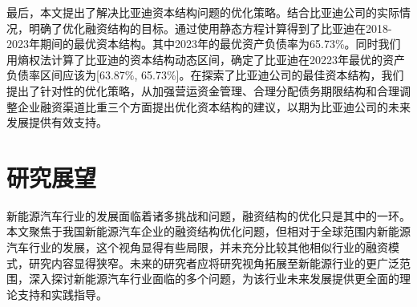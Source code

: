 最后，本文提出了解决比亚迪资本结构问题的优化策略。结合比亚迪公司的实际情况，明确了优化融资结构的目标。通过使用静态方程计算得到了比亚迪在2018-2023年期间的最优资本结构。其中2023年的最优资产负债率为65.73\%。同时我们用熵权法计算了比亚迪的资本结构动态区间，确定了比亚迪在20223年最优的资产负债率区间应该为[63.87\%, 65.73\%]。在探索了比亚迪公司的最佳资本结构，我们提出了针对性的优化策略，从加强营运资金管理、合理分配债务期限结构和合理调整企业融资渠道比重三个方面提出优化资本结构的建议，以期为比亚迪公司的未来发展提供有效支持。
\section{研究展望}
新能源汽车行业的发展面临着诸多挑战和问题，融资结构的优化只是其中的一环。本文聚焦于我国新能源汽车企业的融资结构优化问题，但相对于全球范围内新能源汽车行业的发展，这个视角显得有些局限，并未充分比较其他相似行业的融资模式，研究内容显得狭窄。未来的研究者应将研究视角拓展至新能源行业的更广泛范围，深入探讨新能源汽车行业面临的多个问题，为该行业未来发展提供更全面的理论支持和实践指导。